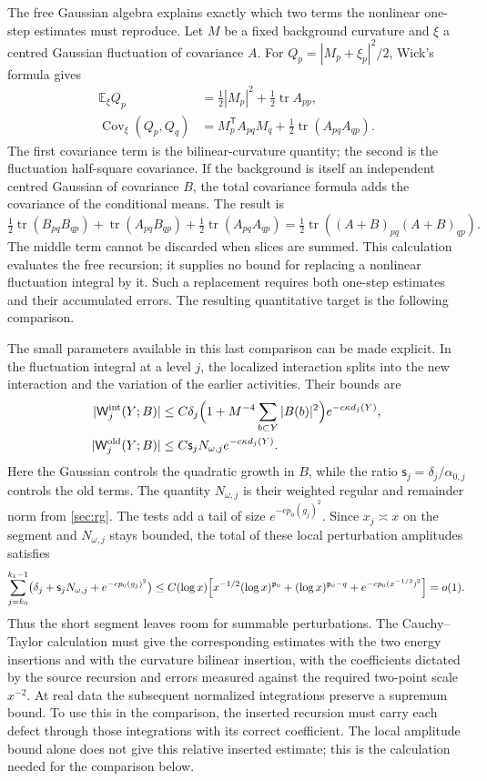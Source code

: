 \documentclass[11pt,letterpaper,reqno]{amsart}
\theoremstyle{definition}
\theoremstyle{remark}
\newcommand{\tr}{\operatorname{tr}}
\begin{document}
The free Gaussian algebra explains exactly which two terms the
nonlinear one-step estimates must reproduce. Let $M$ be a fixed
background curvature and $\xi$ a centred Gaussian fluctuation of
covariance $A$. For $Q_p=|M_p+\xi_p|^2/2$, Wick's formula gives
\begin{align*}
 \mathbb E_\xi Q_p&=\tfrac12|M_p|^2+\tfrac12\tr A_{pp},\\
 \operatorname{Cov}_\xi(Q_p,Q_q)
      &=M_p^{\mathsf T}A_{pq}M_q
                           +\tfrac12\tr(A_{pq}A_{qp}).
\end{align*}
The first covariance term is the bilinear-curvature quantity; the
second is the fluctuation half-square covariance. If the background
is itself an independent centred Gaussian of covariance $B$, the
total covariance formula adds the covariance of the conditional means.
The result is
\[
 \tfrac12\tr(B_{pq}B_{qp})
       +\tr(A_{pq}B_{qp})
       +\tfrac12\tr(A_{pq}A_{qp})
       =\tfrac12\tr((A+B)_{pq}(A+B)_{qp}).
\]
The middle term cannot be discarded when slices are summed. This
calculation evaluates the free recursion; it supplies no bound for
replacing a nonlinear fluctuation integral by it. Such a replacement
requires both one-step estimates and their accumulated errors. The
resulting quantitative target is the following comparison.

The small parameters available in this last comparison can be made
explicit. In the fluctuation integral at a level $j$, the localized
interaction splits into the new interaction and the variation of the
earlier activities. Their bounds are
\[
 \begin{split}
 |\mathsf W_j^{\mathrm{int}}(Y;B)|
 &\le C\delta_j\Bigl(1+M^{-4}\sum_{b\subset Y}|B(b)|^2\Bigr)
                                      e^{-c\kappa d_j(Y)},\\
 |\mathsf W_j^{\mathrm{old}}(Y;B)|
 &\le C\mathsf s_jN_{\omega,j}e^{-c\kappa d_j(Y)}.
 \end{split}
\]
Here the Gaussian controls the quadratic growth in $B$, while the
ratio $\mathsf s_j=\delta_j/\alpha_{0,j}$ controls the old terms.
The quantity $N_{\omega,j}$ is their weighted regular and remainder
norm from \cref{sec:rg}.
The tests add a tail of size $e^{-cp_0(g_j)^2}$. Since $x_j\asymp x$
on the segment and $N_{\omega,j}$ stays bounded, the total of these
local perturbation amplitudes satisfies
\[
 \sum_{j=k_0}^{k_1-1}
 \bigl(\delta_j+\mathsf s_jN_{\omega,j}+e^{-cp_0(g_j)^2}\bigr)
 \le C(\log x)\Bigl[
 x^{-1/2}(\log x)^{\mathfrak p_0}
 +(\log x)^{\mathfrak p_0-q}
 +e^{-cp_0(x^{-1/2})^2}\Bigr]=o(1).
\]
Thus the short segment leaves room for summable perturbations. The
Cauchy--Taylor calculation must give the corresponding estimates with
the two energy insertions and with the curvature bilinear insertion,
with the coefficients dictated by the source recursion and errors
measured against the required two-point scale $x^{-2}$.
At real data the subsequent normalized integrations preserve a
supremum bound. To use this in the comparison, the inserted recursion
must carry each defect through those integrations with its correct
coefficient. The local amplitude bound alone
does not give this relative inserted estimate; this is the calculation
needed for the comparison below.
\end{document}
